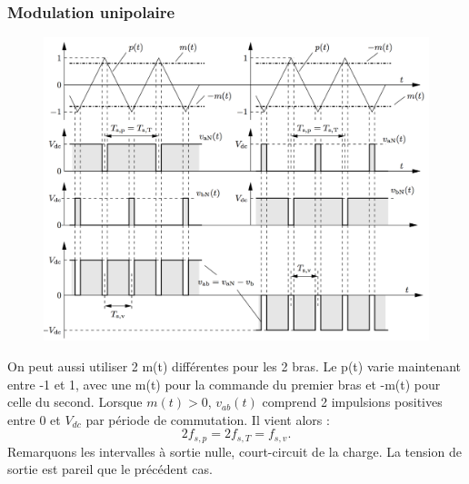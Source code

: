 		\subsubsection{Modulation unipolaire}
			\begin{figure}
			\vspace{-5mm}
			\includegraphics[scale=0.25]{ch4/11}
			\end{figure}
			On peut aussi utiliser 2 m(t) différentes pour les 2 bras. Le p(t) varie maintenant entre -1 et 1, avec une m(t) pour la commande du premier bras et -m(t) pour celle du second. Lorsque $m(t) > 0$, $v_{ab}(t)$ comprend 2 impulsions positives entre 0 et $V_{dc}$ par période de commutation. Il vient alors :
			\begin{equation}
				2 f_{s,p} = 2f_{s,T} = f_{s,v}.
			\end{equation}
			Remarquons les intervalles à sortie nulle, court-circuit de la charge. La tension de sortie est pareil que le précédent cas. \\
			
